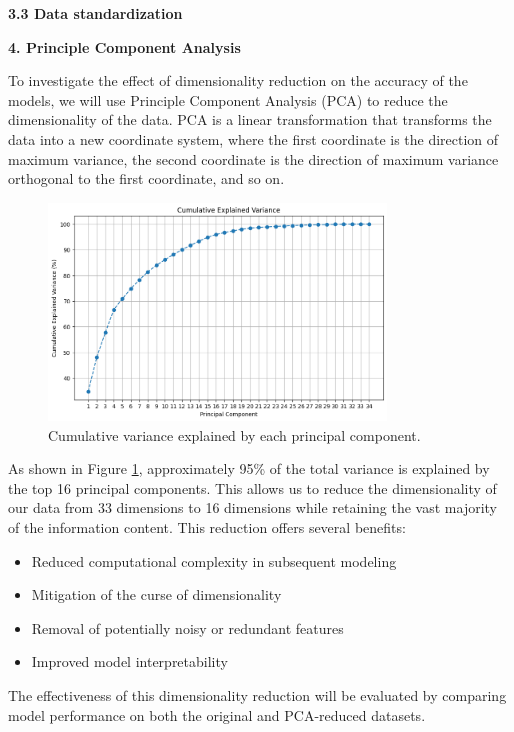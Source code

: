 \documentclass[12pt]{article}
\begin{document}
\textbf{3.3 Data standardization}


\textbf{4. Principle Component Analysis}

To investigate the effect of dimensionality reduction on the accuracy of the models, we will use Principle Component Analysis (PCA) to reduce the dimensionality of the data. PCA is a linear transformation that transforms the data into a new coordinate system, where the first coordinate is the direction of maximum variance, the second coordinate is the direction of maximum variance orthogonal to the first coordinate, and so on. 

\begin{figure}[h!]
\centering
\includegraphics[width=0.8\textwidth]{figures/cum_var_scree.png}
\caption{Cumulative variance explained by each principal component.}
\label{fig:scree_plot}
\end{figure}

As shown in Figure \ref{fig:scree_plot}, approximately 95\% of the total variance is explained by the top 16 principal components. This allows us to reduce the dimensionality of our data from 33 dimensions to 16 dimensions while retaining the vast majority of the information content. This reduction offers several benefits:

\begin{itemize}
    \item Reduced computational complexity in subsequent modeling
    \item Mitigation of the curse of dimensionality
    \item Removal of potentially noisy or redundant features
    \item Improved model interpretability
\end{itemize}

The effectiveness of this dimensionality reduction will be evaluated by comparing model performance on both the original and PCA-reduced datasets.
\end{document}

